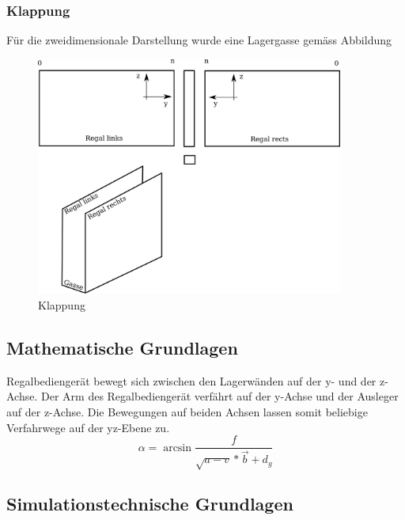\subsubsection{Klappung}
Für die zweidimensionale Darstellung wurde eine Lagergasse gemäss Abbildung %
%
\begin{figure}[h]
  \begin{center}
    \includegraphics[width=0.9\textwidth]{images/klappung.png}
    \caption{Klappung}
    \label{fig:klapp}
  \end{center}
\end{figure}

%
\subsection{Mathematische Grundlagen}
Regalbediengerät bewegt sich zwischen den Lagerwänden auf der y- und der z-Achse. Der Arm des Regalbediengerät verfährt auf der y-Achse und der Ausleger auf der z-Achse. Die Bewegungen auf beiden Achsen lassen somit beliebige Verfahrwege auf der yz-Ebene zu. 
%
\begin{equation}
\alpha = \arcsin \frac{f}{\sqrt{a-v} * \vec{b} + d_{g}}
\end{equation}



%
\subsection{Simulationstechnische Grundlagen}





